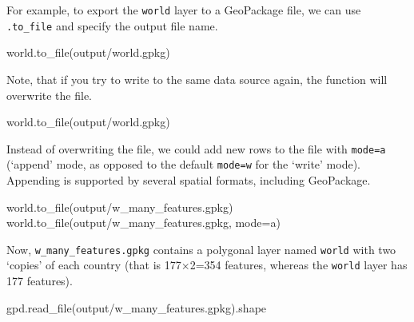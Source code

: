 \documentclass[
  letterpaper,
]{krantz}
\newenvironment{Shaded}{\begin{snugshade}}{\end{snugshade}}
\newcommand{\NormalTok}[1]{\textcolor[rgb]{0.00,0.23,0.31}{#1}}
\newcommand{\OperatorTok}[1]{\textcolor[rgb]{0.37,0.37,0.37}{#1}}
\newcommand{\StringTok}[1]{\textcolor[rgb]{0.13,0.47,0.30}{#1}}
\begin{document}
For example, to export the \texttt{world} layer to a GeoPackage file, we
can use \texttt{.to\_file} and specify the output file name.

\begin{Shaded}
\begin{Highlighting}[]
\NormalTok{world.to\_file(}\StringTok{\textquotesingle{}output/world.gpkg\textquotesingle{}}\NormalTok{)}
\end{Highlighting}
\end{Shaded}

Note, that if you try to write to the same data source again, the
function will overwrite the file.

\begin{Shaded}
\begin{Highlighting}[]
\NormalTok{world.to\_file(}\StringTok{\textquotesingle{}output/world.gpkg\textquotesingle{}}\NormalTok{)}
\end{Highlighting}
\end{Shaded}

Instead of overwriting the file, we could add new rows to the file with
\texttt{mode=\textquotesingle{}a\textquotesingle{}} (`append' mode, as
opposed to the default
\texttt{mode=\textquotesingle{}w\textquotesingle{}} for the `write'
mode). Appending is supported by several spatial formats, including
GeoPackage.

\begin{Shaded}
\begin{Highlighting}[]
\NormalTok{world.to\_file(}\StringTok{\textquotesingle{}output/w\_many\_features.gpkg\textquotesingle{}}\NormalTok{)}
\NormalTok{world.to\_file(}\StringTok{\textquotesingle{}output/w\_many\_features.gpkg\textquotesingle{}}\NormalTok{, mode}\OperatorTok{=}\StringTok{\textquotesingle{}a\textquotesingle{}}\NormalTok{)}
\end{Highlighting}
\end{Shaded}

Now, \texttt{w\_many\_features.gpkg} contains a polygonal layer named
\texttt{world} with two `copies' of each country (that is 177×2=354
features, whereas the \texttt{world} layer has 177 features).

\begin{Shaded}
\begin{Highlighting}[]
\NormalTok{gpd.read\_file(}\StringTok{\textquotesingle{}output/w\_many\_features.gpkg\textquotesingle{}}\NormalTok{).shape}
\end{Highlighting}
\end{Shaded}
\end{document}
